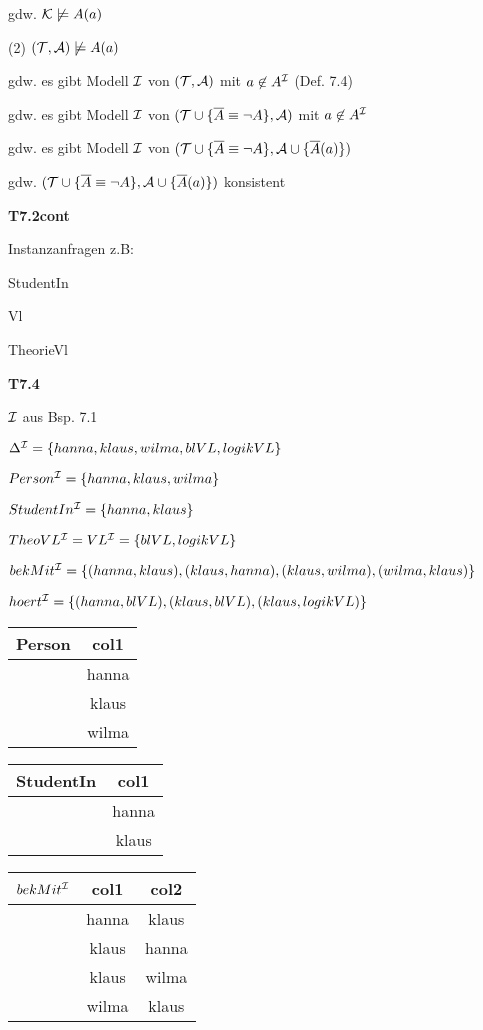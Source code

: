 gdw. $\mathcal{K} \not\models A(a)$

(2) $(\mathcal{T}, \mathcal{A}) \not\models A(a)$

gdw. es gibt Modell $\mathcal{I}$ von $(\mathcal{T}, \mathcal{A})$ mit $a \not\in A^{\mathcal{I}}$ (Def. 7.4)

gdw. es gibt Modell $\mathcal{I}$ von $(\mathcal{T} \cup \{\overline{A} \equiv \neg A\}, \mathcal{A})$ mit $a \not\in A^{\mathcal{I}}$

gdw. es gibt Modell $\mathcal{I}$ von $(\mathcal{T} \cup \{\overline{A} \equiv \neg A\}, \mathcal{A} \cup \{\overline{A}(a)\})$

gdw. $(\mathcal{T} \cup \{\overline{A} \equiv \neg A\}, \mathcal{A} \cup \{\overline{A}(a)\})$ konsistent

\textbf{T7.2cont}

Instanzanfragen z.B:

StudentIn

Vl

TheorieVl

\textbf{T7.4}

$\mathcal{I}$ aus Bsp. 7.1

$\Delta^{\mathcal{I}} = \{hanna, klaus, wilma, blVL, logikVL\}$

$Person^{\mathcal{I}} = \{hanna,klaus,wilma\}$

$StudentIn^{\mathcal{I}} = \{hanna,klaus\}$

$TheoVL^{\mathcal{I}} = VL^{\mathcal{I}} = \{blVL, logikVL\}$

$bekMit^{\mathcal{I}} = \{(hanna,klaus), (klaus, hanna), (klaus, wilma), (wilma, klaus)\}$

$hoert^{\mathcal{I}} = \{(hanna, blVL), (klaus,blVL), (klaus,logikVL)\}$

\begin{tabular}{c | c}
Person & col1 \\ \hline
 & hanna \\
 & klaus \\
 & wilma
\end{tabular}

\begin{tabular}{c | c}
StudentIn & col1 \\ \hline
 & hanna \\
 & klaus
\end{tabular}

\begin{tabular}{c | c | c}
$bekMit^{\mathcal{I}}$ & col1 & col2 \\ \hline
 & hanna & klaus\\
 & klaus & hanna\\
 & klaus & wilma \\
 & wilma & klaus
\end{tabular}

